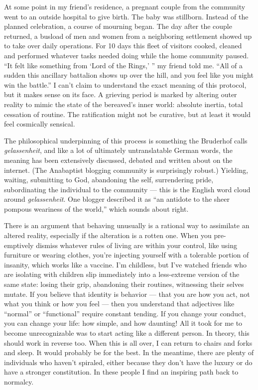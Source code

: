 At some point in my friend's residence, a pregnant couple from the
community went to an outside hospital to give birth. The baby was
stillborn. Instead of the planned celebration, a course of mourning
began. The day after the couple returned, a busload of men and women
from a neighboring settlement showed up to take over daily operations.
For 10 days this fleet of visitors cooked, cleaned and performed
whatever tasks needed doing while the home community paused. ``It felt
like something from `Lord of the Rings,' '' my friend told me. ``All of
a sudden this ancillary battalion shows up over the hill, and you feel
like you might win the battle.'' I can't claim to understand the exact
meaning of this protocol, but it makes sense on its face. A grieving
period is marked by altering outer reality to mimic the state of the
bereaved's inner world: absolute inertia, total cessation of routine.
The ratification might not be curative, but at least it would feel
cosmically sensical.

The philosophical underpinning of this process is something the
Bruderhof calls \emph{gelassenheit}, and like a lot of ultimately
untranslatable German words, the meaning has been extensively discussed,
debated and written about on the internet. (The Anabaptist blogging
community is surprisingly robust.) Yielding, waiting, submitting to God,
abandoning the self, surrendering pride, subordinating the individual to
the community --- this is the English word cloud around
\emph{gelassenheit}. One blogger described it as ``an antidote to the
sheer pompous weariness of the world,'' which sounds about right.

There is an argument that behaving unusually is a rational way to
assimilate an altered reality, especially if the alteration is a rotten
one. When you pre-emptively dismiss whatever rules of living are within
your control, like using furniture or wearing clothes, you're injecting
yourself with a tolerable portion of insanity, which works like a
vaccine. I'm childless, but I've watched friends who are isolating with
children slip immediately into a less-extreme version of the same state:
losing their grip, abandoning their routines, witnessing their selves
mutate. If you believe that identity is behavior --- that you are how
you act, not what you think or how you feel --- then you understand that
adjectives like ``normal'' or ``functional'' require constant tending.
If you change your conduct, you can change your life: how simple, and
how daunting! All it took for me to become unrecognizable was to start
acting like a different person. In theory, this should work in reverse
too. When this is all over, I can return to chairs and forks and sleep.
It would probably be for the best. In the meantime, there are plenty of
individuals who haven't spiraled, either because they don't have the
luxury or do have a stronger constitution. In these people I find an
inspiring path back to normalcy.

